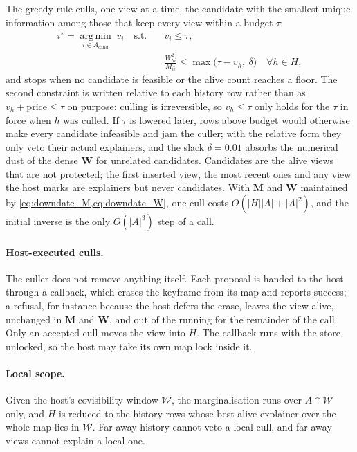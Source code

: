 The greedy rule culls, one view at a time, the candidate with the smallest unique information among those that keep every view within a budget $\tau$:
\begin{equation}
    \begin{aligned}
        i^\star=\operatorname*{arg\,min}_{i\in A_{\text{cand}}}\; v_i
        \quad\text{s.t.}\quad & v_i\le\tau,\\
        & \frac{W_{hi}^2}{M_{ii}}\le\max\!\big(\tau-v_h,\ \delta\big)\quad\forall h\in H,
    \end{aligned}
    \label{eq:greedy_rule}
\end{equation}
and stops when no candidate is feasible or the alive count reaches a floor. The second constraint is written relative to each history row rather than as $v_h+\text{price}\le\tau$ on purpose: culling is irreversible, so $v_h\le\tau$ only holds for the $\tau$ in force when $h$ was culled. If $\tau$ is lowered later, rows above budget would otherwise make every candidate infeasible and jam the culler; with the relative form they only veto their actual explainers, and the slack $\delta=0.01$ absorbs the numerical dust of the dense $\mathbf{W}$ for unrelated candidates. Candidates are the alive views that are not protected; the first inserted view, the most recent ones and any view the host marks are explainers but never candidates. With $\mathbf{M}$ and $\mathbf{W}$ maintained by \cref{eq:downdate_M,eq:downdate_W}, one cull costs $O(|H||A|+|A|^2)$, and the initial inverse is the only $O(|A|^3)$ step of a call.

\paragraph{Host-executed culls.}
The culler does not remove anything itself. Each proposal is handed to the host through a callback, which erases the keyframe from its map and reports success; a refusal, for instance because the host defers the erase, leaves the view alive, unchanged in $\mathbf{M}$ and $\mathbf{W}$, and out of the running for the remainder of the call. Only an accepted cull moves the view into $H$. The callback runs with the store unlocked, so the host may take its own map lock inside it.

\paragraph{Local scope.}
Given the host's covisibility window $\mathcal{W}$, the marginalisation runs over $A\cap\mathcal{W}$ only, and $H$ is reduced to the history rows whose best alive explainer over the whole map lies in $\mathcal{W}$. Far-away history cannot veto a local cull, and far-away views cannot explain a local one.

